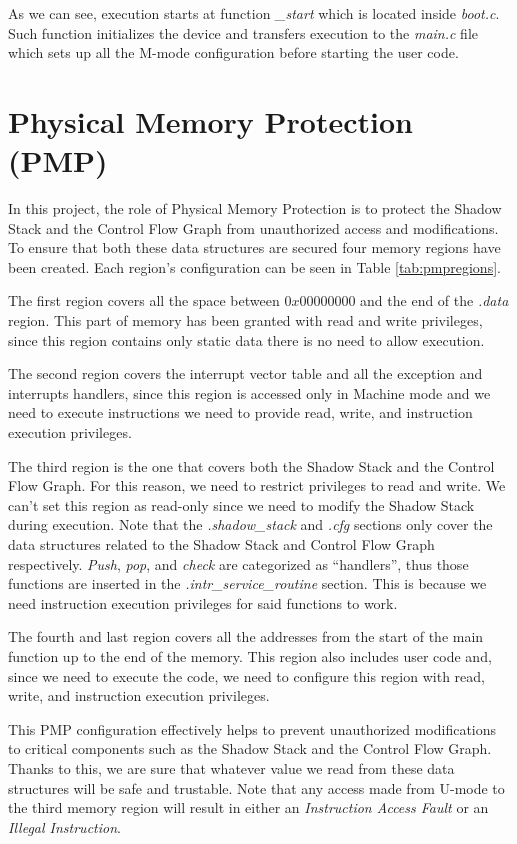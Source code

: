As we can see, execution starts at function \textit{\_start} which is located inside
\textit{boot.c}. Such function initializes the device and transfers execution to
the \textit{main.c} file which sets up all the M-mode configuration before
starting the user code.

\section{Physical Memory Protection (PMP)}
\label{sec:project_pmp}

In this project, the role of Physical Memory Protection is to protect the Shadow
Stack and the Control Flow Graph from unauthorized access and modifications. To ensure
that both these data structures are secured four memory regions have been created.
Each region's configuration can be seen in Table \ref{tab:pmpregions}.

The first region covers all the space between $0x00000000$ and the end of the
\textit{.data} region. This part of memory has been granted with read and write
privileges, since this region contains only static data there is no need to allow
execution.

The second region covers the interrupt vector table and all the exception and interrupts
handlers, since this region is accessed only in Machine mode and we need to
execute instructions we need to provide read, write, and instruction execution
privileges.

The third region is the one that covers both the Shadow Stack and the Control
Flow Graph. For this reason, we need to restrict privileges to read and write. We
can't set this region as read-only since we need to modify the Shadow Stack during
execution. Note that the \textit{.shadow\_stack} and \textit{.cfg} sections only
cover the data structures related to the Shadow Stack and Control Flow Graph
respectively. \textit{Push}, \textit{pop}, and \textit{check} are categorized as
``handlers'', thus those functions are inserted in the \textit{.intr\_service\_routine}
section. This is because we need instruction execution privileges for said functions
to work.

The fourth and last region covers all the addresses from the start of the main function
up to the end of the memory. This region also includes user code and, since we need
to execute the code, we need to configure this region with read, write, and
instruction execution privileges.

This PMP configuration effectively helps to prevent unauthorized modifications
to critical components such as the Shadow Stack and the Control Flow Graph. Thanks
to this, we are sure that whatever value we read from these data structures will
be safe and trustable. Note that any access made from U-mode to the third memory
region will result in either an \textit{Instruction Access Fault} or an \textit{Illegal
Instruction}.

